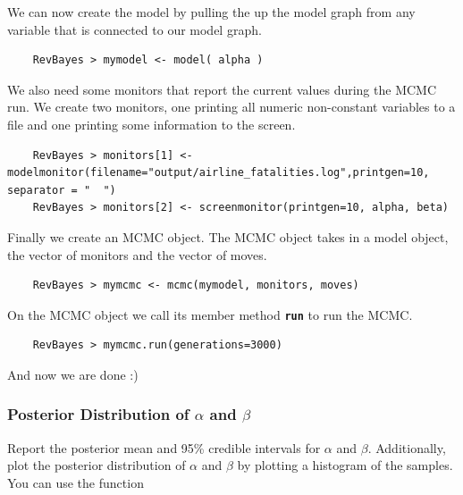 \documentclass[11pt]{article}
\newcommand{\cl}[1]{{\texttt{\textbf{#1}}}}
\begin{document}
We can now create the model by pulling the up the model graph from any variable that is connected to our model graph.
{\tt \begin{snugshade*}
\begin{lstlisting} 
    RevBayes > mymodel <- model( alpha )
\end{lstlisting}
\end{snugshade*}}
We also need some monitors that report the current values during the MCMC run.
We create two monitors, one printing all numeric non-constant variables to a file and one printing some information to the screen.
{\tt \begin{snugshade*}
\begin{lstlisting} 
    RevBayes > monitors[1] <- modelmonitor(filename="output/airline_fatalities.log",printgen=10, separator = "	")
    RevBayes > monitors[2] <- screenmonitor(printgen=10, alpha, beta)
\end{lstlisting}
\end{snugshade*}}
Finally we create an MCMC object.
The MCMC object takes in a model object, the vector of monitors and the vector of moves.
{\tt \begin{snugshade*}
\begin{lstlisting} 
    RevBayes > mymcmc <- mcmc(mymodel, monitors, moves)
\end{lstlisting}
\end{snugshade*}}
On the MCMC object we call its member method \cl{run} to run the MCMC.
{\tt \begin{snugshade*}
\begin{lstlisting} 
    RevBayes > mymcmc.run(generations=3000)
\end{lstlisting}
\end{snugshade*}}
And now we are done :)


\subsubsection*{Posterior Distribution of $\alpha$ and $\beta$}
 
Report the posterior mean and 95\% credible intervals for $\alpha$ and $\beta$. 
Additionally, plot the posterior distribution of $\alpha$ and $\beta$ by plotting a histogram of the samples. 
You can use the \R function
\end{document}
